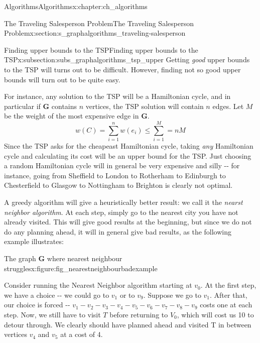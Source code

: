 \documentclass[oneside,10pt,]{book}
\numberwithin{equation}{section}
\newcommand{\bfG}{\mathbf{G}}
\begin{document}
\begin{chapterptx}{Algorithms}{}{Algorithms}{}{}{x:chapter:ch_algorithms}
\begin{sectionptx}{The Traveling Salesperson Problem}{}{The Traveling Salesperson Problem}{}{}{x:section:s_graphalgorithms_traveling-salesperson}
%
\begin{subsectionptx}{Finding upper bounds to the TSP}{}{Finding upper bounds to the TSP}{}{}{x:subsection:subs_graphalgorithms_tsp_upper}
Getting \emph{good} upper bounds to the TSP will turns out to be difficult.  However, finding not so good upper bounds will turn out to be quite easy.%
\par
For instance, any solution to the TSP will be a Hamiltonian cycle, and in particular if \(\bfG\) contains \(n\) vertices, the TSP solution will contain \(n\) edges.  Let \(M\) be the weight of the most expensive edge in \(\bfG\).%
%
\begin{equation*}
w(C)=\sum_{i=1}^n w(e_i)\leq \sum_{i=1}^ M = nM
\end{equation*}
Since the TSP asks for the cheapeast Hamiltonian cycle, taking \emph{any} Hamiltonian cycle and calculating its cost will be an upper bound for the TSP.  Just choosing a random Hamiltonian cycle will in general be very expensive and silly -{}-{} for instance, going from Sheffield to London to Rotherham to Edinburgh to Chesterfield to Glasgow to Nottingham to Brighton is clearly not optimal.%
\par
A greedy algorithm will give a heuristically better result: we call it the \emph{nearst neighbor algorithm}.  At each step, simply go to the nearest city you have not already visited.  This will give good results at the beginning, but since we do not do any planning ahead, it will in general give bad results, as the following example illustrates:%
\begin{figureptx}{The graph \(\bfG\) where nearest neighbour struggles}{x:figure:fig_nearestneighbourbadexample}{}%
\begin{image}{0.15}{0.7}{0.15}%
%
\end{image}%
\tcblower
\end{figureptx}%
Consider running the Nearest Neighbor algorithm starting at \(v_0\).  At the first step, we have a choice -{}-{} we could go to \(v_1\) or to \(v_9\).  Suppose we go to \(v_1\).  After that, our choice is forced -{}-{} \(v_1-v_2-v_3-v_4-v_5-v_6-v_7-v_8-v_9\) costs one at each step.  Now, we still have to visit \(T\) before returning to \(V_0\), which will cost us 10 to detour through.  We clearly should have planned ahead and visited \textdollar{}\textdollar{}T\textdollar{}\textdollar{} in between vertices \(v_4\) and \(v_5\) at a cost of 4.%

\end{subsectionptx}
\end{sectionptx}
\end{chapterptx}
\end{document}
